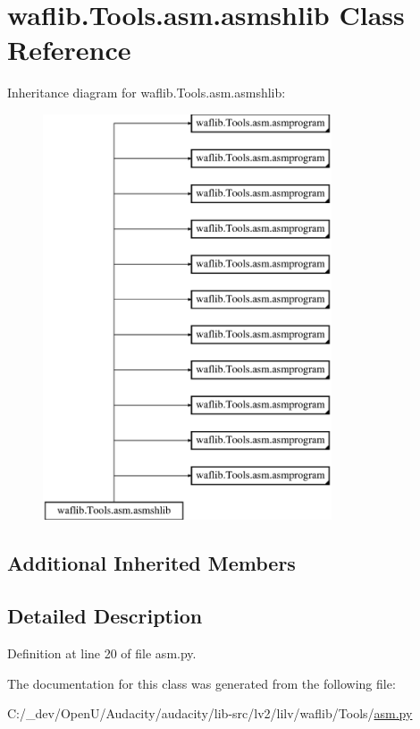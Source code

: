 \hypertarget{classwaflib_1_1_tools_1_1asm_1_1asmshlib}{}\section{waflib.\+Tools.\+asm.\+asmshlib Class Reference}
\label{classwaflib_1_1_tools_1_1asm_1_1asmshlib}
Inheritance diagram for waflib.\+Tools.\+asm.\+asmshlib\+:\begin{figure}[H]
\begin{center}
\leavevmode
\includegraphics[height=12.000000cm]{classwaflib_1_1_tools_1_1asm_1_1asmshlib}
\end{center}
\end{figure}
\subsection*{Additional Inherited Members}


\subsection{Detailed Description}


Definition at line 20 of file asm.\+py.



The documentation for this class was generated from the following file\+:\begin{DoxyCompactItemize}
\item 
C\+:/\+\_\+dev/\+Open\+U/\+Audacity/audacity/lib-\/src/lv2/lilv/waflib/\+Tools/\hyperlink{lilv_2waflib_2_tools_2asm_8py}{asm.\+py}\end{DoxyCompactItemize}
